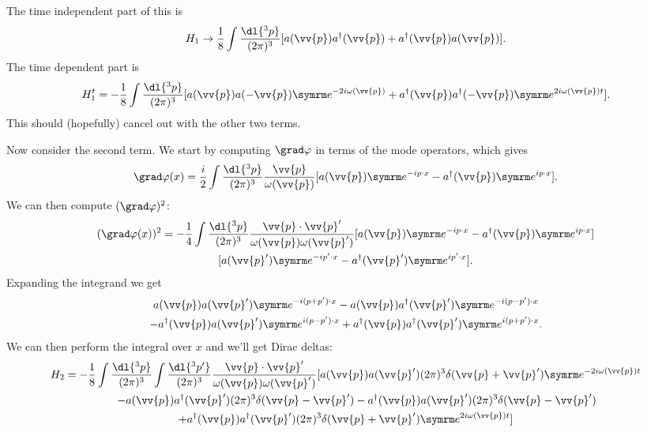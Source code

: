 The time independent part of this is
\begin{equation}
    H_1 \to \frac{1}{8} \int \frac{\dl{^3p}}{(2\pi)^3} [a(\vv{p})a^\hermit(\vv{p}) + a^\hermit(\vv{p})a(\vv{p})].
\end{equation}
The time dependent part is
\begin{equation}
    H_1^t = -\frac{1}{8} \int \frac{\dl{^3p}}{(2\pi)^3} [a(\vv{p})a(-\vv{p}) \e^{-2i\omega(\vv{p})} + a^\hermit(\vv{p})a^\hermit(-\vv{p}) \e^{2i\omega(\vv{p})t}].
\end{equation}
This should (hopefully) cancel out with the other two terms.

Now consider the second term.
We start by computing \(\grad \varphi\) in terms of the mode operators, which gives
\begin{equation}
    \grad \varphi(x) = \frac{i}{2}\int \frac{\dl{^3p}}{(2\pi)^3} \frac{\vv{p}}{\omega(\vv{p})} [a(\vv{p})\e^{-ip\cdot x} - a^\hermit(\vv{p})\e^{ip\cdot x}].
\end{equation}
We can then compute \((\grad \varphi)^2\):
\begin{multline}
    (\grad\varphi(x))^2 = -\frac{1}{4} \int \frac{\dl{^3p}}{(2\pi)^3} \frac{\vv{p}\cdot \vv{p}'}{\omega(\vv{p})\omega(\vv{p}')} [a(\vv{p})\e^{-ip\cdot x} - a^\hermit(\vv{p})\e^{ip\cdot x}]\\
    [a(\vv{p}')\e^{-ip'\cdot x} - a^\hermit(\vv{p}')\e^{ip'\cdot x}].
\end{multline}
Expanding the integrand we get
\begin{multline}
    a(\vv{p})a(\vv{p}')\e^{-i(p + p')\cdot x} - a(\vv{p})a^\hermit(\vv{p}') \e^{-i(p - p')\cdot x}\\
    - a^\hermit(\vv{p}) a(\vv{p}')\e^{i(p - p')\cdot x} + a^\hermit(\vv{p})a^\hermit(\vv{p}')\e^{i(p + p')\cdot x}.
\end{multline}
We can then perform the integral over \(x\) and we'll get Dirac deltas:
\begin{multline}
    H_2 = -\frac{1}{8} \int \frac{\dl{^3p}}{(2\pi)^3} \int \frac{\dl{^3p'}}{(2\pi)^3} \frac{\vv{p}\cdot \vv{p}'}{\omega(\vv{p})\omega(\vv{p}')} [a(\vv{p})a(\vv{p}')(2\pi)^3\delta(\vv{p} + \vv{p}')\e^{-2i\omega(\vv{p})t}\\
    \qquad- a(\vv{p})a^\hermit(\vv{p}') (2\pi)^3\delta(\vv{p} - \vv{p}') - a^\hermit(\vv{p}) a(\vv{p}')(2\pi)^3\delta(\vv{p} - \vv{p}')\\
    + a^\hermit(\vv{p})a^\hermit(\vv{p}')(2\pi)^3\delta(\vv{p} + \vv{p}')\e^{2i\omega(\vv{p})t}]
\end{multline}
